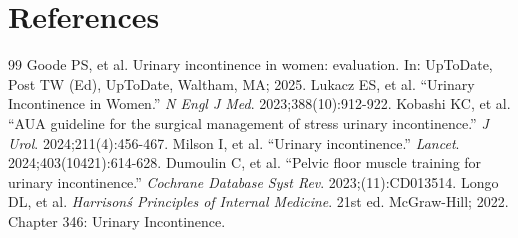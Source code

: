 \section*{References}
\begin{thebibliography}{99}
 Goode PS, et al. Urinary incontinence in women: evaluation. In: UpToDate, Post TW (Ed), UpToDate, Waltham, MA; 2025.
 Lukacz ES, et al. ``Urinary Incontinence in Women.'' \emph{N Engl J Med}. 2023;388(10):912-922.
 Kobashi KC, et al. ``AUA guideline for the surgical management of stress urinary incontinence.'' \emph{J Urol}. 2024;211(4):456-467.
 Milson I, et al. ``Urinary incontinence.'' \emph{Lancet}. 2024;403(10421):614-628.
 Dumoulin C, et al. ``Pelvic floor muscle training for urinary incontinence.'' \emph{Cochrane Database Syst Rev}. 2023;(11):CD013514.
 Longo DL, et al. \emph{Harrison\'s Principles of Internal Medicine}. 21st ed. McGraw-Hill; 2022. Chapter 346: Urinary Incontinence.
\end{thebibliography}
